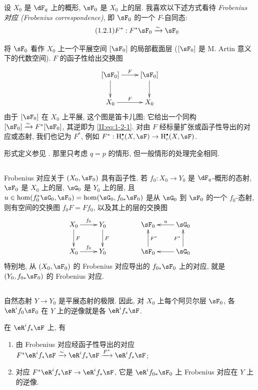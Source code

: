 设 $X_0$ 是 $\dF_q$ 上的概形, $\sF_0$ 是 $X_0$ 上的层. 我喜欢以下述方式看待 \emph{Frobenius 对应 (Frobenius correspondence)}, 即 $\sF_0$ 的一个 $F$-自同态:
\begin{equation*}\tag{1.2.1}\label{II:eq:1-2-1}
  F^* : F^*\sF_0 \iso \sF_0
\end{equation*}

将 $\sF_0$ 看作 $X_0$ 上一个平展空间 $[\sF_0]$ 的局部截面层 ($[\sF_0]$ 是 M. Artin 意义下的代数空间). $F$ 的函子性给出交换图
\[\xymatrix{
  [\sF_0] \ar[r]^-F \ar[d]
    & [\sF_0] \ar[d] \\
  X_0 \ar[r]^F
    & X_0
}\]
由于 $[\sF_0]$ 在 $X_0$ 上平展, 这个图是笛卡儿图; 它给出一个同构 $[\sF_0]\iso F^*[\sF_0]$, 其逆即为 \eqref{II:eq:1-2-1}. 对由 $F$ 经标量扩张或函子性导出的对应或态射, 我们也记为 $F^*$, 例如 $F^*:\h_c^\bullet(X,\sF)\to \h_c^\bullet(X,\sF)$.

形式定义参见 \cite[XV.1,2]{sga5}. 那里只考虑 $q=p$ 的情形, 但一般情形的处理完全相同.

\subsection{}\label{II:1-3}

Frobenius 对应关于 $(X_0,\sF_0)$ 具有函子性. 若 $f_0:X_0\to Y_0$ 是 $\dF_q$-概形的态射, $\sF_0$ 是 $X_0$ 上的层, $\sG_0$ 是 $Y_0$ 上的层, 且 %
$u\in\hom(f_0^*\sG_0,\sF_0)=\hom(\sG_0,f_{0*}\sF_0)$ 是从 $\sG_0$ 到 $\sF_0$ 的一个 $f_0$-态射, 则有空间的交换图 $f_0 F = F f_0$, 以及其上的层的交换图
\[\xymatrix{
  X_0 \ar[r]^-{f_0} \ar[d]^-F
    & Y_0 \ar[d]^-F \\
  X_0 \ar[r]^-{f_0}
    & Y_0
}\qquad\qquad
\xymatrix{
  \sF_0
    & \ar[l]_-u \sG_0 \\
  \sF_0 \ar[u]_-{F^*}
    & \ar[l] \sG_0 \ar[u]^-{F^*}
}\]
特别地, 从 $(X_0,\sF_0)$ 的 Frobenius 对应导出的 $f_{0*}\sF_0$ 上的对应, 就是 $(Y_0,f_{0*}\sF_0)$ 的 Frobenius 对应.

\subsection{}\label{II:1-4}

自然态射 $Y\to Y_0$ 是平展态射的极限. 因此, 对 $X_0$ 上每个阿贝尔层 $\sF_0$, 各 $\eR^if_0\sF_0$ 在 $Y$ 上的逆像就是各 $\eR^if_*\sF$.

在 $\eR^if_*\sF$ 上, 有
\begin{enumerate}[\indent a)]
  \item 由 Frobenius 对应经函子性导出的对应
    $F^*\eR^i f_*\sF \iso \eR^i f_*\sF \xrightarrow{F^*} \eR^if_*\sF$;
  \item 对应 $F^*\eR^if_*\sF\to\eR^if_*\sF$, 它是 $\eR^i f_{0*}\sF_0$ 上 Frobenius 对应在 $Y$ 上的逆像.
\end{enumerate}

